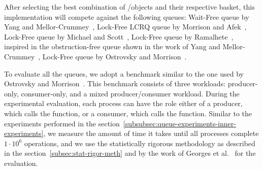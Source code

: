 After selecting the best combination of \LL/\IC objects and their respective basket, this implementation will compete against the following queues:  Wait-Free queue by Yang and Mellor-Crummey~\cite{DBLP_conf_ppopp_YangM16},  Lock-Free LCRQ queue by Morrison and Afek~\cite{ppopp2013x86queues}, Lock-Free queue by Michael and Scott~\cite{DBLP_conf_podc_MichaelS96}, Lock-Free queue by Ramalhete~\cite{Ramalhete_Correia_MPMC_2016}, inspired in the obstruction-free queue shown in the work of Yang and Mellor-Crummey~\cite{DBLP_conf_ppopp_YangM16}, Lock-Free queue by Ostrovsky and Morrison~\cite{scalingconcurrent2020}.

To evaluate all the queues, we adopt a benchmark similar to the one used by Ostrovsky and Morrison~\cite{scalingconcurrent2020}. This benchmark consists of three workloads: producer-only, consumer-only, and a mixed producer/consumer workload. During the experimental evaluation, each process can have the role either of a producer, which calls the \Enq function, or a consumer, which calls the \Deq function. Similar to the experiments performed in the section~\ref{subsubsec:queue-experiments-inner-experiments}, we measure the amount of time it takes until all processes complete \(1\cdot 10^6\) operations, and we use the statistically rigorous methodology as described in the section~\ref{subsec:stat-rigor-meth} and by the work of Georges et al.~\cite{DBLP_conf_oopsla_GeorgesBE07} for the evaluation.